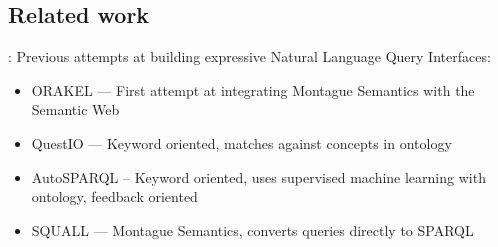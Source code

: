\documentclass[logoontitle,tabu,supertabular,aspectratio=43]{preney-uwindsor-beamer}
\begin{document}
\subsection{Related work}
\begin{frame}{\insertsection: \insertsubsection}
    Previous attempts at building expressive Natural Language Query Interfaces:
    \begin{itemize}
        \item ORAKEL\cite{cimiano2007orakel} --- First attempt at integrating Montague Semantics with the Semantic Web
        \item QuestIO\cite{tablan2008natural} --- Keyword oriented, matches against concepts in ontology
        \item AutoSPARQL\cite{lehmann2011autosparql} -- Keyword oriented, uses supervised machine learning with ontology, feedback oriented
        \item SQUALL\cite{ferre2014squall} --- Montague Semantics, converts queries directly to SPARQL
    \end{itemize}
\end{frame}


\end{document}
